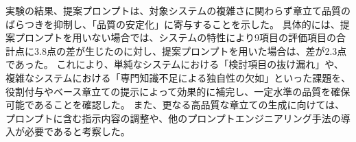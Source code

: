 \documentclass[uplatex, 10pt, a4j, dvipdfmx]{jsarticle}
\newcommand{\AbstractStandalone}{}
\begin{document}
\begin{AbstractBody}
実験の結果、提案プロンプトは、対象システムの複雑さに関わらず章立て品質のばらつきを抑制し、「品質の安定化」に寄与することを示した。
具体的には、提案プロンプトを用いない場合では、システムの特性により9項目の評価項目の合計点に3.8点の差が生じたのに対し、提案プロンプトを用いた場合は、差が2.3点であった。
これにより、単純なシステムにおける「検討項目の抜け漏れ」や、複雑なシステムにおける「専門知識不足による独自性の欠如」といった課題を、役割付与やベース章立ての提示によって効果的に補完し、一定水準の品質を確保可能であることを確認した。
また、更なる高品質な章立ての生成に向けては、プロンプトに含む指示内容の調整や、他のプロンプトエンジニアリング手法の導入が必要であると考察した。

\ifdefined\AbstractStandalone
\end{AbstractBody}
\end{document}
